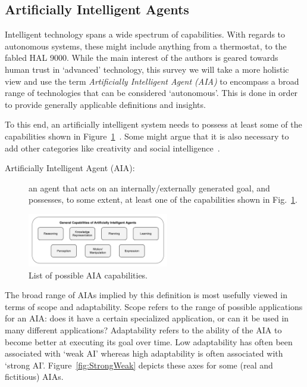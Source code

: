 \subsection{Artificially Intelligent Agents} \label{sec:aias}
    Intelligent technology spans a wide spectrum of capabilities. With regards to autonomous systems, these might include anything from a thermostat, to the fabled HAL 9000. While the main interest of the authors is geared towards human trust in `advanced' technology, this survey we will take a more holistic view and use the term \textit{Artificially Intelligent Agent (AIA)} to encompass a broad range of technologies that can be considered `autonomous'. This is done in order to provide generally applicable definitions and insights. 

    To this end, an artificially intelligent system needs to possess at least some of the capabilities shown in Figure~\ref{fig:AIcapabilities}~\cite{Russell2010-wv,Nilsson2009-rp,Luger2008-vf}. Some might argue that it is also necessary to add other categories like creativity and social intelligence~\cite{Tao2005-kh}. 
    \begin{description}
        \item[Artificially Intelligent Agent (AIA):] an agent that acts on an internally/externally generated goal, and possesses, to some extent, at least one of the capabilities shown in Fig.~\ref{fig:AIcapabilities}.
    \end{description}

	\begin{figure}[htbp]
    	\centering
     	\includegraphics[width=0.55\textwidth]{Figures/AI_capabilities}
    	\caption{List of possible AIA capabilities.}
        \label{fig:AIcapabilities}
    \end{figure}

    The broad range of AIAs implied by this definition is most usefully viewed in terms of scope and adaptability. Scope refers to the range of possible applications for an AIA: does it have a certain specialized application, or can it be used in many different applications? Adaptability refers to the ability of the AIA to become better at executing its goal over time. Low adaptability has often been associated with `weak AI' whereas high adaptability is often associated with `strong AI'.  Figure~\ref{fig:StrongWeak} depicts these axes for some (real and fictitious) AIAs.


